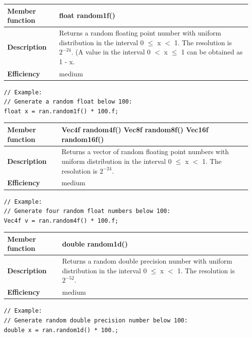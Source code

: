 \documentclass[11pt,a4paper,oneside,openright]{report}
\newcommand{\vspacesmall}{\vspace{3mm}}
\begin{document}
\begin{tabular}{|p{30mm}|p{100mm}|}
\hline
\bfseries Member function & float random1f() \\ \hline
\bfseries Description & Returns a random floating point number with uniform distribution in the interval 0 $\leq$ x $<$ 1. The resolution is $2^{-24}$. \newline
(A value in the interval 0 $<$ x $\leq$ 1 can be obtained as 1 - x. \\ \hline
\bfseries Efficiency & medium \\ \hline
\end{tabular}
\begin{lstlisting}[frame=none]
// Example:
// Generate a random float below 100:
float x = ran.random1f() * 100.f;
\end{lstlisting}
\vspacesmall

\begin{tabular}{|p{30mm}|p{100mm}|}
\hline
\bfseries Member function & Vec4f random4f() \newline
Vec8f random8f() \newline
Vec16f random16f() \\ \hline
\bfseries Description & Returns a vector of random floating point numbers with uniform distribution in the interval 0 $\leq$ x $<$ 1. The resolution is $2^{-24}$.  \\ \hline
\bfseries Efficiency & medium \\ \hline
\end{tabular}
\begin{lstlisting}[frame=none]
// Example:
// Generate four random float numbers below 100:
Vec4f v = ran.random4f() * 100.f;
\end{lstlisting}
\vspacesmall

\begin{tabular}{|p{30mm}|p{100mm}|}
\hline
\bfseries Member function & double random1d() \\ \hline
\bfseries Description & Returns a random double precision number with uniform distribution in the interval 0 $\leq$ x $<$ 1. The resolution is $2^{-52}$. \\ \hline
\bfseries Efficiency & medium \\ \hline
\end{tabular}
\begin{lstlisting}[frame=none]
// Example:
// Generate random double precision number below 100:
double x = ran.random1d() * 100.;
\end{lstlisting}
\vspacesmall
\end{document}
